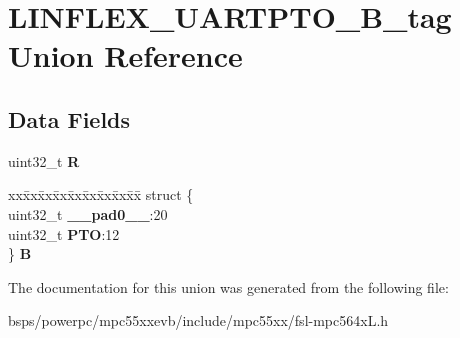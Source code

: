 \hypertarget{unionLINFLEX__UARTPTO__32B__tag}{}\section{L\+I\+N\+F\+L\+E\+X\+\_\+\+U\+A\+R\+T\+P\+T\+O\+\_\+B\+\_\+tag Union Reference}
\label{unionLINFLEX__UARTPTO__32B__tag}
\subsection*{Data Fields}
\begin{DoxyCompactItemize}
\item 
\mbox{\label{unionLINFLEX__UARTPTO__32B__tag_a54c298f746e7af61d671344b3090ddf0}} 
uint32\+\_\+t {\bfseries R}
\item 
\mbox{\label{unionLINFLEX__UARTPTO__32B__tag_a03e3e193e2320d498c36e0de0a7685b0}} 
\begin{tabbing}
xx\=xx\=xx\=xx\=xx\=xx\=xx\=xx\=xx\=\kill
struct \{\\
\>uint32\_t {\bfseries \_\_pad0\_\_}:20\\
\>uint32\_t {\bfseries PTO}:12\\
\} {\bfseries B}\\

\end{tabbing}\end{DoxyCompactItemize}


The documentation for this union was generated from the following file\+:\begin{DoxyCompactItemize}
\item 
bsps/powerpc/mpc55xxevb/include/mpc55xx/fsl-\/mpc564x\+L.\+h\end{DoxyCompactItemize}
